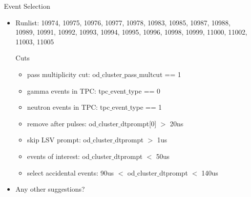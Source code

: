 \documentclass[9pt]{beamer}
\begin{document}
\begin{frame}{Event Selection}
\begin{itemize}
[bullet]
\item Runlist: 10974, 10975, 10976, 10977, 10978, 10983, 10985, 10987,
  10988, 10989, 10991, 10992, 10993, 10994, 10995, 10996, 10998, 10999,
  11000, 11002, 11003, 11005
\begin{exampleblock}{Cuts}
	\begin{itemize}
	[default]
	\item pass multiplicity cut: od$\_$cluster$\_$pass$\_$multcut == 1  
	\item gamma events in TPC: tpc$\_$event$\_$type == 0
	\item neutron events in TPC: tpc$\_$event$\_$type == 1
	\item remove after pulses: od$\_$cluster$\_$dtprompt[0] $>$ 20ns
        \item skip LSV prompt:  od$\_$cluster$\_$dtprompt $>$ 1us
        \item events of interest:  od$\_$cluster$\_$dtprompt $<$ 50us
        \item select accidental events: 90us $<$ od$\_$cluster$\_$dtprompt $<$ 140us
	\end{itemize}
\end{exampleblock}	
\item Any other suggestions?
\end{itemize}
\end{frame}
\end{document}
